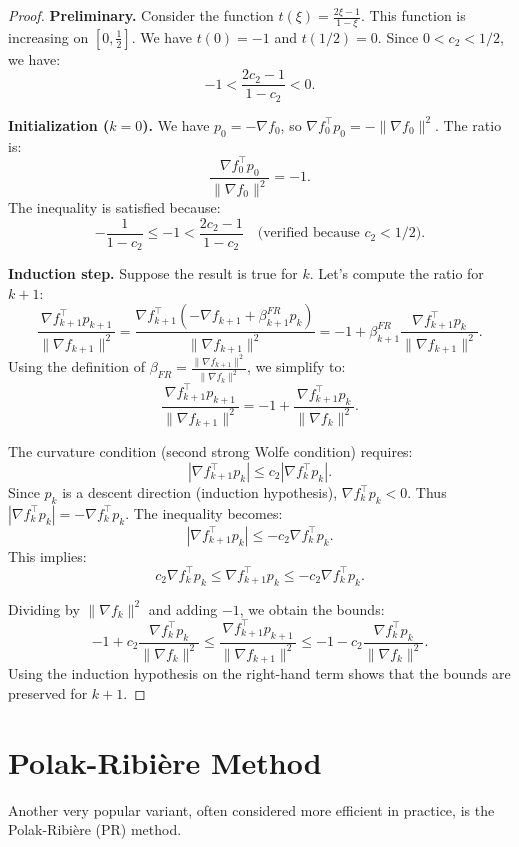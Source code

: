 \begin{proof}
\textbf{Preliminary.} Consider the function $t(\xi) = \frac{2\xi - 1}{1 - \xi}$.
This function is increasing on $[0, \frac{1}{2}]$.
We have $t(0) = -1$ and $t(1/2) = 0$.
Since $0 < c_2 < 1/2$, we have:
\[
-1 < \frac{2c_2 - 1}{1 - c_2} < 0.
\]

\textbf{Initialization ($k=0$).}
We have $p_0 = -\nabla f_0$, so $\nabla f_0^\top p_0 = -\|\nabla f_0\|^2$.
The ratio is:
\[
\frac{\nabla f_0^\top p_0}{\|\nabla f_0\|^2} = -1.
\]
The inequality is satisfied because:
\[
-\frac{1}{1-c_2} \le -1 < \frac{2c_2 - 1}{1 - c_2} \quad \text{(verified because } c_2 < 1/2 \text{)}.
\]

\textbf{Induction step.} Suppose the result is true for $k$.
Let's compute the ratio for $k+1$:
\[
\frac{\nabla f_{k+1}^\top p_{k+1}}{\|\nabla f_{k+1}\|^2} 
= \frac{\nabla f_{k+1}^\top (-\nabla f_{k+1} + \beta_{k+1}^{FR} p_k)}{\|\nabla f_{k+1}\|^2}
= -1 + \beta_{k+1}^{FR} \frac{\nabla f_{k+1}^\top p_k}{\|\nabla f_{k+1}\|^2}.
\]
Using the definition of $\beta_{FR} = \frac{\|\nabla f_{k+1}\|^2}{\|\nabla f_k\|^2}$, we simplify to:
\[
\frac{\nabla f_{k+1}^\top p_{k+1}}{\|\nabla f_{k+1}\|^2} = -1 + \frac{\nabla f_{k+1}^\top p_k}{\|\nabla f_k\|^2}.
\]

The curvature condition (second strong Wolfe condition) requires:
\[
|\nabla f_{k+1}^\top p_k| \le c_2 |\nabla f_k^\top p_k|.
\]
Since $p_k$ is a descent direction (induction hypothesis), $\nabla f_k^\top p_k < 0$. Thus $|\nabla f_k^\top p_k| = -\nabla f_k^\top p_k$.
The inequality becomes:
\[
|\nabla f_{k+1}^\top p_k| \le -c_2 \nabla f_k^\top p_k.
\]
This implies:
\[
c_2 \nabla f_k^\top p_k \le \nabla f_{k+1}^\top p_k \le -c_2 \nabla f_k^\top p_k.
\]

Dividing by $\|\nabla f_k\|^2$ and adding $-1$, we obtain the bounds:
\[
-1 + c_2 \frac{\nabla f_k^\top p_k}{\|\nabla f_k\|^2} \le \frac{\nabla f_{k+1}^\top p_{k+1}}{\|\nabla f_{k+1}\|^2} \le -1 - c_2 \frac{\nabla f_k^\top p_k}{\|\nabla f_k\|^2}.
\]
Using the induction hypothesis on the right-hand term shows that the bounds are preserved for $k+1$.
\end{proof}

\section{Polak-Ribière Method}

Another very popular variant, often considered more efficient in practice, is the Polak-Ribière (PR) method.

